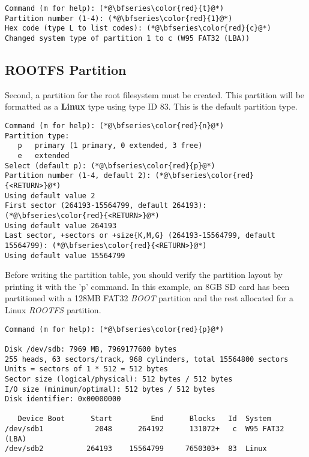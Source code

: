 \begin{lstlisting}[style=text]
Command (m for help): (*@\bfseries\color{red}{t}@*)
Partition number (1-4): (*@\bfseries\color{red}{1}@*)
Hex code (type L to list codes): (*@\bfseries\color{red}{c}@*)
Changed system type of partition 1 to c (W95 FAT32 (LBA))
\end{lstlisting}


\subsection{ROOTFS Partition}
Second, a partition for the root filesystem must be created. This partition will be formatted as a \textbf{Linux} type using type ID 83. This is the default partition type.


\begin{lstlisting}[style=text]
Command (m for help): (*@\bfseries\color{red}{n}@*)
Partition type:
   p   primary (1 primary, 0 extended, 3 free)
   e   extended
Select (default p): (*@\bfseries\color{red}{p}@*)
Partition number (1-4, default 2): (*@\bfseries\color{red}{<RETURN>}@*)
Using default value 2
First sector (264193-15564799, default 264193): (*@\bfseries\color{red}{<RETURN>}@*)
Using default value 264193
Last sector, +sectors or +size{K,M,G} (264193-15564799, default 15564799): (*@\bfseries\color{red}{<RETURN>}@*)
Using default value 15564799
\end{lstlisting}



Before writing the partition table, you should verify the partition layout by printing it with the 'p' command. In this example, an 8GB SD card has been partitioned with a 128MB FAT32 \textit{BOOT} partition and the rest allocated for a Linux \textit{ROOTFS} partition.


\begin{lstlisting}[style=text]
Command (m for help): (*@\bfseries\color{red}{p}@*)

Disk /dev/sdb: 7969 MB, 7969177600 bytes
255 heads, 63 sectors/track, 968 cylinders, total 15564800 sectors
Units = sectors of 1 * 512 = 512 bytes
Sector size (logical/physical): 512 bytes / 512 bytes
I/O size (minimum/optimal): 512 bytes / 512 bytes
Disk identifier: 0x00000000

   Device Boot      Start         End      Blocks   Id  System
/dev/sdb1            2048      264192      131072+   c  W95 FAT32 (LBA)
/dev/sdb2          264193    15564799     7650303+  83  Linux
\end{lstlisting}


